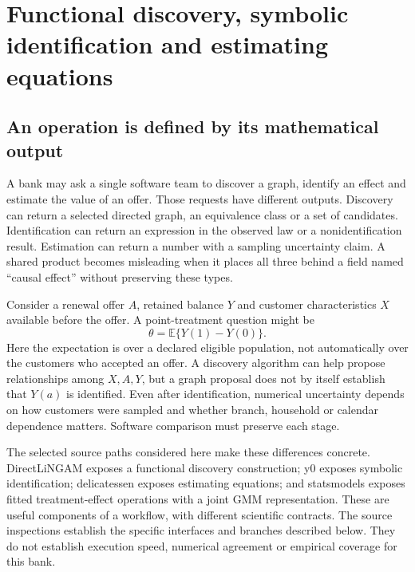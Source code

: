 \chapter{Functional discovery, symbolic identification and estimating equations}
\label{v13:sw-functional}

\section{An operation is defined by its mathematical output}

A bank may ask a single software team to discover a graph, identify an effect
and estimate the value of an offer. Those requests have different outputs.
Discovery can return a selected directed graph, an equivalence class or a set
of candidates. Identification can return an expression in the observed law or
a nonidentification result. Estimation can return a number with a sampling
uncertainty claim. A shared product becomes misleading when it places all
three behind a field named ``causal effect'' without preserving these types.

Consider a renewal offer $A$, retained balance $Y$ and customer characteristics
$X$ available before the offer. A point-treatment question might be
\[
 \theta=\mathbb E\{Y(1)-Y(0)\}.
\]
Here the expectation is over a declared eligible population, not automatically
over the customers who accepted an offer. A discovery algorithm can help
propose relationships among $X,A,Y$, but a graph proposal does not by itself
establish that $Y(a)$ is identified. Even after identification, numerical
uncertainty depends on how customers were sampled and whether branch, household
or calendar dependence matters. Software comparison must preserve each stage.

The selected source paths considered here make these differences concrete.
DirectLiNGAM exposes a functional discovery construction; y0 exposes symbolic
identification; delicatessen exposes estimating equations; and statsmodels
exposes fitted treatment-effect operations with a joint GMM representation.
These are useful components of a workflow, with different scientific contracts.
The source inspections establish the specific interfaces and branches described
below. They do not establish execution speed, numerical agreement or empirical
coverage for this bank. \citep{v13_sw_lingam,v13_sw_y0,v13_sw_delicatessen,v13_sw_statsmodels}

